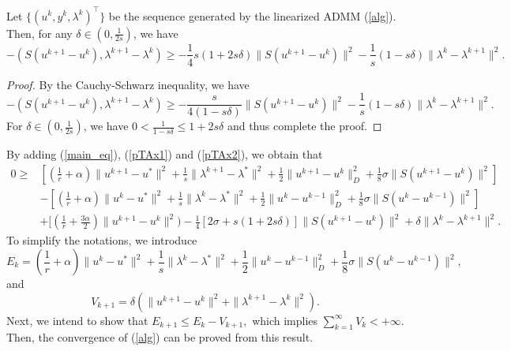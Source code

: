 \documentclass[final]{siamart171218}
\theoremstyle{remark}
\begin{document}

\begin{lemma}
	Let $\{(u^k, y^k, \lambda^k)^\top\}$ be the sequence generated by the linearized ADMM (\ref{alg}). Then, for any $\delta \in (0, \frac{1}{2s})$, we have
	\begin{equation}
	\label{pTAx2}
	- \left( S(u^{k+1}- u^{k}),\lambda^{k+1}  - \lambda^k\right) \geq
	- \frac{1}{4} s(1 + 2s\delta) \|S(u^{k+1}- u^k)\|^2 - \frac{1}{s} (1-s\delta) \|\lambda^k - \lambda^{k+1} \|^2.
	\end{equation}
\end{lemma}
\begin{proof}
	By the Cauchy-Schwarz inequality, we have
	\begin{equation*}
	- \left( S(u^{k+1}- u^{k}),\lambda^{k+1}  - \lambda^k\right) \geq
	- \frac{s}{4 (1 -s\delta)} \|S(u^{k+1}- u^k)\|^2 - \frac{1}{s} (1-s\delta) \|\lambda^k - \lambda^{k+1} \|^2.
	\end{equation*}
	For $\delta \in (0, \frac{1}{2s})$, we have $0<\frac{1}{1- s\delta} \leq 1 + 2s\delta$ and thus complete the proof.
\end{proof}

By adding (\ref{main_eq}), (\ref{pTAx1}) and (\ref{pTAx2}), we obtain that
\begin{equation}
\label{left0}
\begin{aligned}
0  \geq& \left[(\frac{1}{r} + \alpha ) \|u^{k+1}- u^*\|^2  + \frac{1}{s}\|\lambda^{k+1}- \lambda^*\|^2 + \frac{1}{2} \|u^{k+1} - u^{k}\|^2_D + \frac{1}{8}  \sigma \|S(u^{k+1} - u^{k})\|^2  \right]    \\
& - \left[(\frac{1}{r} + \alpha )\|u^{k}- u^*\|^2 + \frac{1}{s}\|\lambda^k- \lambda^*\|^2 + \frac{1}{2} \|u^{k} - u^{k-1}\|^2_D + \frac{1}{8} \sigma \|S(u^{k} - u^{k-1})\|^2  \right] \\
& + [(\frac{1}{r} + \frac{3\alpha}{2} )\|u^{k+1}- u^{k}\|^2)   - \frac{1}{4} [2\sigma + s(1 + 2s\delta)] \|S(u^{k+1}- u^k)\|^2  + \delta \|\lambda^k - \lambda^{k+1} \|^2.
\end{aligned}
\end{equation}
To simplify the notations, we introduce
\begin{equation}\label{def_E}
E_k = (\frac{1}{r} + \alpha )\|u^{k}- u^*\|^2 + \frac{1}{s}\|\lambda^k- \lambda^*\|^2 + \frac{1}{2} \|u^{k} - u^{k-1}\|^2_D + \frac{1}{8} \sigma \|S(u^{k} - u^{k-1})\|^2,
\end{equation}
and
\begin{equation*}%
V_{k+1} = \delta (\|u^{k+1} - u^k \|^2 + \|\lambda^{k+1} - \lambda^k \|^2).
\end{equation*}
Next, we intend to show that
$
E_{k+1} \leq E_{k} - V_{k+1},
$
which implies $\sum_{k=1}^{\infty} V_k < + \infty$.
Then, the convergence of (\ref{alg}) can be proved from this result.
\end{document}

